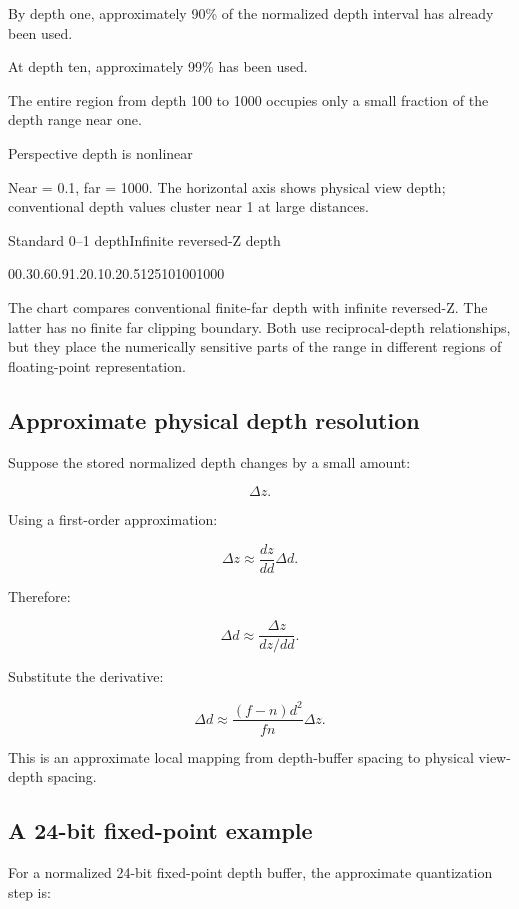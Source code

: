 By depth one, approximately 90\% of the normalized depth interval has already been used.

At depth ten, approximately 99\% has been used.

The entire region from depth 100 to 1000 occupies only a small fraction of the depth range near one.

Perspective depth is nonlinear

Near = 0.1, far = 1000. The horizontal axis shows physical view depth; conventional depth values cluster near 1 at large distances.

Standard 0--1 depthInfinite reversed-Z depth

00.30.60.91.20.10.20.5125101001000

The chart compares conventional finite-far depth with infinite reversed-Z. The latter has no finite far clipping boundary. Both use reciprocal-depth relationships, but they place the numerically sensitive parts of the range in different regions of floating-point representation.

\subsection{Approximate physical depth resolution}\label{02-foundations-ii-ch033-approximate-physical-depth-resolution}

Suppose the stored normalized depth changes by a small amount:

\[
 \Delta z.
\]

Using a first-order approximation:

\[
 \Delta z\approx\frac{dz}{dd}\Delta d.
\]

Therefore:

\[
 \Delta d\approx \frac{\Delta z}{dz/dd}.
\]

Substitute the derivative:

\[
 \boxed{ \Delta d \approx \frac{(f-n)d^2}{fn}\Delta z }.
\]

This is an approximate local mapping from depth-buffer spacing to physical view-depth spacing.

\subsection{A 24-bit fixed-point example}\label{02-foundations-ii-ch033-a-24-bit-fixed-point-example}

For a normalized 24-bit fixed-point depth buffer, the approximate quantization step is:

